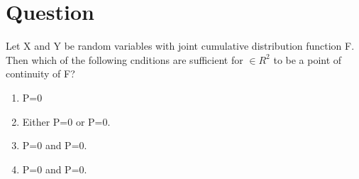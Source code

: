 \documentclass[journal,12pt,twocolumn]{IEEEtran}
\begin{document}
\section{Question}
Let X and Y be random variables with joint cumulative distribution function F. Then which of the following cnditions are sufficient for $\in R^2$ to be a point of continuity of F?
\begin{enumerate}
\item P=0
\item Either P=0 or P=0.
\item P=0 and P=0.
\item P=0 and P=0.
\end{enumerate}
\end{document}
